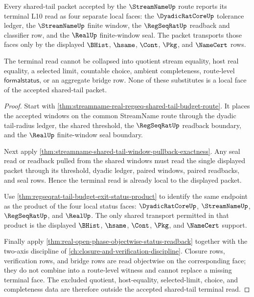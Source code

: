 \begin{theorem}
\label{thm:streamname-shared-tail-budget-terminal-face-noncollapse}
Every shared-tail packet accepted by the $\StreamNameUp$ route reports its
terminal L10 read as four separate local faces: the $\DyadicRatCoreUp$
tolerance ledger, the $\StreamNameUp$ finite window, the $\RegSeqRatUp$
readback and classifier row, and the $\RealUp$ finite-window seal. The packet
transports those faces only by the displayed $\BHist$, $\hsame$, $\Cont$,
$\Pkg$, and $\NameCert$ rows.

The terminal read cannot be collapsed into quotient stream equality, host real
equality, a selected limit, countable choice, ambient completeness, route-level
$\mathsf{formalstatus}$, or an aggregate bridge row. None of these substitutes
is a local face of the accepted shared-tail packet.
\end{theorem}
\begin{proof}
Start with
\autoref{thm:streamname-real-regseq-shared-tail-budget-route}. It places the
accepted windows on the common StreamName route through the dyadic tail-radius
ledger, the shared threshold, the $\RegSeqRatUp$ readback boundary, and the
$\RealUp$ finite-window seal boundary.

Next apply \autoref{thm:streamname-shared-tail-window-pullback-exactness}. Any
seal read or readback pulled from the shared windows must read the single
displayed packet through its threshold, dyadic ledger, paired windows, paired
readbacks, and seal rows. Hence the terminal read is already local to the
displayed packet.

Use \autoref{thm:regseqrat-tail-budget-exit-status-product} to identify the
same endpoint as the product of the four local status faces:
$\DyadicRatCoreUp$, $\StreamNameUp$, $\RegSeqRatUp$, and $\RealUp$. The only
shared transport permitted in that product is the displayed $\BHist$, $\hsame$,
$\Cont$, $\Pkg$, and $\NameCert$ support.

Finally apply \autoref{thm:real-open-phase-objectwise-status-readback} together
with the two-axis discipline of
\autoref{ch:closure-and-verification-discipline}. Closure rows, verification
rows, and bridge rows are read objectwise on the corresponding face; they do
not combine into a route-level witness and cannot replace a missing terminal
face. The excluded quotient, host-equality, selected-limit, choice, and
completeness data are therefore outside the accepted shared-tail terminal read.
\end{proof}
